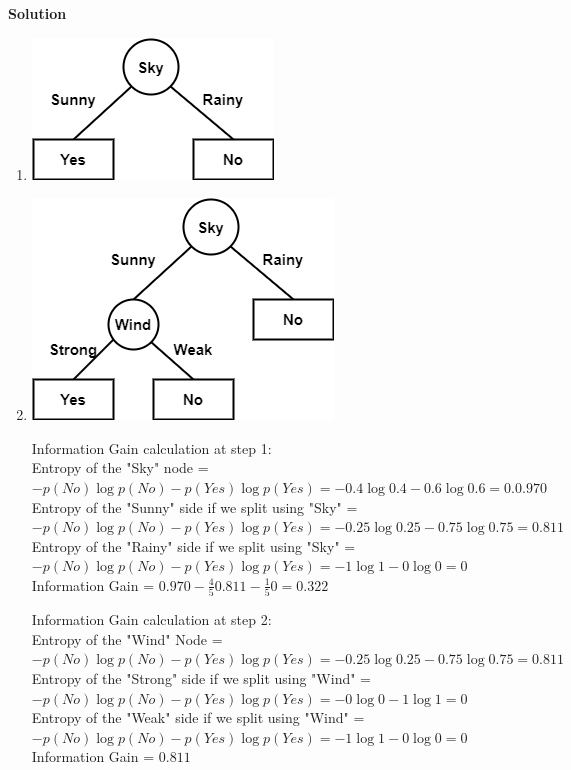 \documentclass[twoside]{article}
\begin{document}
\textbf{Solution}
\begin{enumerate}
	\item 
	
	\includegraphics[scale=0.48]{3a.png}
	
	\item
	
	\includegraphics[scale=0.48]{3b.png}
	
	Information Gain calculation at step 1:\\
	Entropy of the "Sky" node = $-p(No)\log p(No) - p(Yes) \log p(Yes) = -0.4 \log 0.4 - 0.6 \log 0.6 = 0.0.970$\\
	Entropy of the "Sunny" side if we split using "Sky" = $-p(No)\log p(No) - p(Yes) \log p(Yes) = -0.25 \log 0.25 - 0.75 \log 0.75 = 0.811$\\
	Entropy of the "Rainy" side if we split using "Sky" = $-p(No)\log p(No) - p(Yes) \log p(Yes) = -1 \log 1 - 0 \log 0 = 0$\\
	Information Gain = $0.970 - \frac{4}{5}0.811 - \frac{1}{5}0 = 0.322$
	
	Information Gain calculation at step 2:\\
	Entropy of the "Wind" Node = $-p(No)\log p(No) - p(Yes) \log p(Yes) = -0.25 \log 0.25 - 0.75 \log 0.75 = 0.811$\\
	Entropy of the "Strong" side if we split using "Wind" = $-p(No)\log p(No) - p(Yes) \log p(Yes) = - 0 \log 0 -1 \log 1  = 0$\\
	Entropy of the "Weak" side if we split using "Wind" = $-p(No)\log p(No) - p(Yes) \log p(Yes) = -1 \log 1 - 0 \log 0 = 0$\\
	Information Gain = $0.811$
\end{enumerate}
\end{document}
